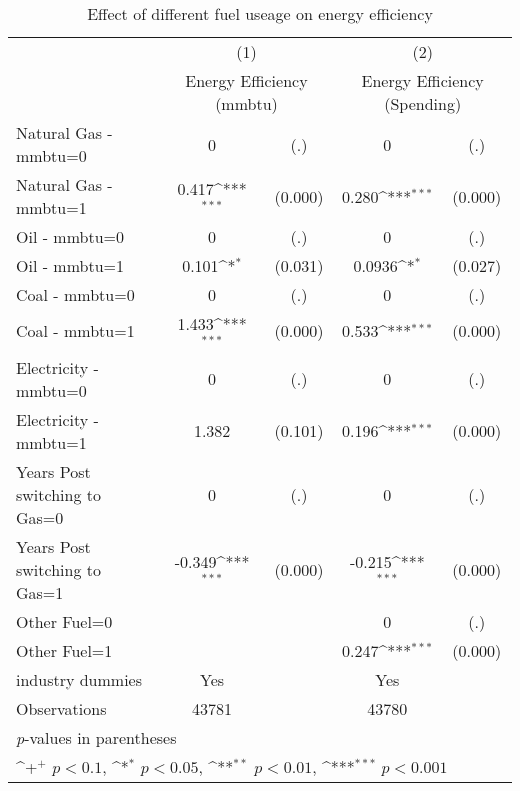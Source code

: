 \begin{table}[htbp]\centering
\def\sym#1{\ifmmode^{#1}\else\(^{#1}\)\fi}
\caption{Effect of different fuel useage on energy efficiency}
\begin{tabular}{l*{2}{cc}}
\toprule
                    &\multicolumn{2}{c}{(1)}           &\multicolumn{2}{c}{(2)}           \\
                    &\multicolumn{2}{c}{Energy Efficiency (mmbtu)}&\multicolumn{2}{c}{Energy Efficiency (Spending)}\\
\midrule
Natural Gas - mmbtu=0&           0         &         (.)&           0         &         (.)\\
Natural Gas - mmbtu=1&       0.417\sym{***}&     (0.000)&       0.280\sym{***}&     (0.000)\\
Oil - mmbtu=0       &           0         &         (.)&           0         &         (.)\\
Oil - mmbtu=1       &       0.101\sym{*}  &     (0.031)&      0.0936\sym{*}  &     (0.027)\\
Coal - mmbtu=0      &           0         &         (.)&           0         &         (.)\\
Coal - mmbtu=1      &       1.433\sym{***}&     (0.000)&       0.533\sym{***}&     (0.000)\\
Electricity - mmbtu=0&           0         &         (.)&           0         &         (.)\\
Electricity - mmbtu=1&       1.382         &     (0.101)&       0.196\sym{***}&     (0.000)\\
Years Post switching to Gas=0&           0         &         (.)&           0         &         (.)\\
Years Post switching to Gas=1&      -0.349\sym{***}&     (0.000)&      -0.215\sym{***}&     (0.000)\\
Other Fuel=0        &                     &            &           0         &         (.)\\
Other Fuel=1        &                     &            &       0.247\sym{***}&     (0.000)\\
industry dummies    &         Yes         &            &         Yes         &            \\
\midrule
Observations        &       43781         &            &       43780         &            \\
\bottomrule
\multicolumn{5}{l}{\footnotesize \textit{p}-values in parentheses}\\
\multicolumn{5}{l}{\footnotesize \sym{+} \(p<0.1\), \sym{*} \(p<0.05\), \sym{**} \(p<0.01\), \sym{***} \(p<0.001\)}\\
\end{tabular}
\end{table}
